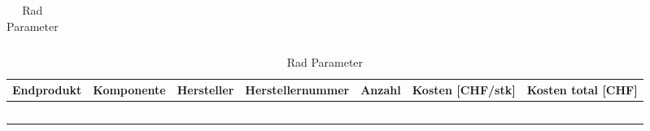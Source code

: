 \documentclass[main.tex]{subfiles} %
\begin{document}
\begin{landscape}
\begin{table}[h]
\begin{tabular}{|c|c|c|c|c|c|c|}
                            &                            &                        &                                    &                     &                            &                                 \\ \hline
                            \end{tabular}
    \caption{Rad Parameter}
    \label{tab:Budgetplanung}
\end{table}




\begin{table}[h]                                    %
    \centering
    \begin{tabular}{|c|c|c|c|c|c|c|}                        %
        \hline
        \textbf{Endprodukt} & \textbf{Komponente}        & \textbf{Hersteller}    & \textbf{Herstellernummer}          & \textbf{Anzahl}     & \textbf{Kosten [CHF/stk]}  & \textbf{Kosten total [CHF]}   \\ \hline
        &                            &                        &                                    &                     &                            &                                 \\ \hline
        &                            &                        &                                    &                     &                            &                                 \\ \hline
        &                            &                        &                                    &                     &                            &                                 \\ \hline
        &                            &                        &                                    &                     &                            &                                 \\ \hline
        &                            &                        &                                    &                     &                            &                                 \\ \hline
        \end{tabular}
\caption{Rad Parameter}
\label{tab:Ausgabne Produktentwicklung 1}
\end{table}

\end{landscape}
\end{document}
